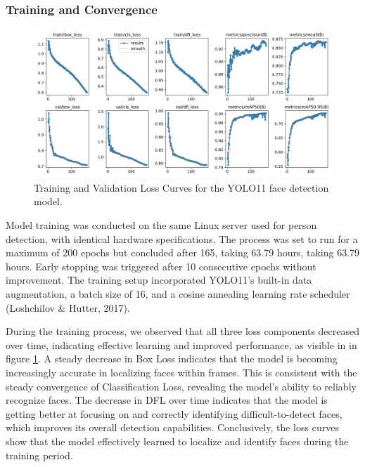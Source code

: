 \documentclass[
  man,floatsintext]{apa6}
\begin{document}
\subsubsection{Training and Convergence}\label{training-and-convergence-1}

\begin{figure}

{\centering \includegraphics[width=450px]{images/yolo_face_loss_curves} 

}

\caption{Training and Validation Loss Curves for the YOLO11 face detection model.}\label{fig:face-loss-curves}
\end{figure}

Model training was conducted on the same Linux server used for person detection, with identical hardware specifications. The process was set to run for a maximum of 200 epochs but concluded after 165, taking 63.79 hours, taking 63.79 hours. Early stopping was triggered after 10 consecutive epochs without improvement. The training setup incorporated YOLO11's built-in data augmentation, a batch size of 16, and a cosine annealing learning rate scheduler (Loshchilov \& Hutter, 2017).

During the training process, we observed that all three loss components decreased over time, indicating effective learning and improved performance, as visible in in figure \ref{fig:face-loss-curves}. A steady decrease in Box Loss indicates that the model is becoming increasingly accurate in localizing faces within frames. This is consistent with the steady convergence of Classification Loss, revealing the model's ability to reliably recognize faces. The decrease in DFL over time indicates that the model is getting better at focusing on and correctly identifying difficult-to-detect faces, which improves its overall detection capabilities. Conclusively, the loss curves show that the model effectively learned to localize and identify faces during the training period.
\end{document}
